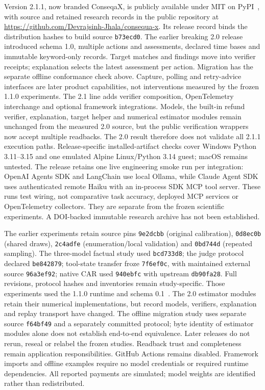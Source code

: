 \documentclass[conference]{IEEEtran}
\begin{document}
Version 2.1.1, now branded ConseqaX, is publicly available under MIT on PyPI~\cite{artifact},
with source and retained research records in the public repository at
\url{https://github.com/Devrajsinh-Jhala/consequa-x}. Its release record binds
the distribution hashes to build source \texttt{b73ecd0}. The earlier breaking
2.0 release introduced schema 1.0, multiple actions and assessments, declared
time bases and immutable keyword-only records. Target matches and findings
move into verifier receipts; explanation selects the latest assessment per
action. Migration has the separate offline conformance check above. Capture,
polling and retry-advice interfaces are later product capabilities, not
interventions measured by the frozen 1.1.0 experiments. The 2.1 line adds
verifier composition, OpenTelemetry interchange and optional framework
integrations. Models, the built-in refund verifier, explanation, target helper
and numerical estimator modules remain unchanged from the measured 2.0
source, but the public verification wrappers now accept multiple readbacks.
The 2.0 result therefore does not validate all 2.1.1 execution paths.
Release-specific installed-artifact checks cover Windows Python 3.11--3.15
and one emulated Alpine Linux/Python 3.14 guest; macOS remains untested.
The release retains one live engineering smoke run per integration:
OpenAI Agents SDK and LangChain use local Ollama, while Claude Agent SDK
uses authenticated remote Haiku with an in-process SDK MCP tool server.
These runs test wiring, not comparative task accuracy, deployed MCP services
or OpenTelemetry collectors. They are separate from the frozen scientific
experiments. A DOI-backed immutable research archive
has not been established.

The earlier experiments retain source pins \texttt{9e2dcbb} (original
calibration), \texttt{0d8ec0b} (shared draws), \texttt{2c4adfe}
(enumeration/local validation) and \texttt{0bd744d} (repeated sampling).
The three-model factual study used \texttt{bcd733d8}; the judge protocol
declared \texttt{be842879}; tool-state transfer froze \texttt{7f6ef0c},
with maintained external source \texttt{96a3ef92}; native CAR used
\texttt{940ebfc} with upstream \texttt{db90fa28}. Full revisions, protocol
hashes and inventories remain study-specific. Those experiments used
the 1.1.0 runtime and schema 0.1~\cite{experimentartifact}. The 2.0 estimator
modules retain their numerical implementations, but record models, verifiers,
explanation and replay transport have changed. The offline migration study
uses separate source \texttt{f64bf49} and a separately committed protocol;
byte identity of estimator modules alone does not establish end-to-end
equivalence. Later releases do
not rerun, reseal or relabel the frozen studies. Readback trust and completeness remain application
responsibilities. GitHub Actions remains disabled.
Framework imports and offline examples require no model credentials or required
runtime dependencies. All reported payments are simulated; model weights are
identified rather than redistributed.
\end{document}
